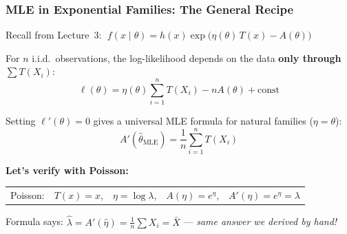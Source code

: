 \documentclass[aspectratio=169]{beamer}
\begin{document}
\begin{frame}
\frametitle{MLE in Exponential Families: The General Recipe}

\small
Recall from Lecture~3: $\;f(x \mid \theta) = h(x)\exp\!\big(\eta(\theta)\,T(x) - A(\theta)\big)$

\vspace{0.1cm}
For $n$ i.i.d.\ observations, the log-likelihood depends on the data \textbf{only through} $\sum T(X_i)$:
\vspace{-0.15cm}
$$\ell(\theta) = \eta(\theta)\sum_{i=1}^n T(X_i) - nA(\theta) + \text{const}$$

\vspace{-0.35cm}
Setting $\ell'(\theta) = 0$ gives a universal MLE formula for natural families ($\eta = \theta$):
\vspace{-0.15cm}
$$\boxed{A'(\hat\theta_{\text{MLE}}) = \frac{1}{n}\sum_{i=1}^n T(X_i)}$$

\vspace{-0.15cm}\pause
\textbf{Let's verify with Poisson:}
\vspace{-0.1cm}
\begin{center}
\renewcommand{\arraystretch}{1.3}
\begin{tabular}{@{}lllll@{}}
  \footnotesize Poisson: & \footnotesize $T(x) = x$, & \footnotesize $\eta = \log\lambda$, & \footnotesize $A(\eta) = e^\eta$, & \footnotesize $A'(\eta) = e^\eta = \lambda$ \\
\end{tabular}
\end{center}

\vspace{-0.1cm}
Formula says: $\hat\lambda = A'(\hat\eta) = \frac{1}{n}\sum X_i = \bar{X}$ \;\textcolor{paramgreen}{\checkmark} \;--- \textit{same answer we derived by hand!}

\vspace{0.1cm}
\begin{center}
\end{center}
\end{frame}
\end{document}
